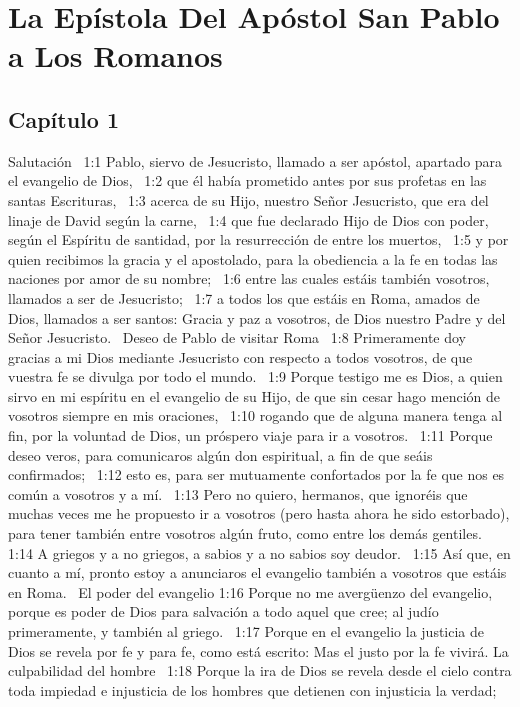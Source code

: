 \chapter{La Epístola Del Apóstol San Pablo a Los Romanos}


\section*{Capítulo 1}
Salutación  
1:1 Pablo, siervo de Jesucristo, llamado a ser apóstol, apartado para el evangelio de Dios,  
1:2 que él había prometido antes por sus profetas en las santas Escrituras,  
1:3 acerca de su Hijo, nuestro Señor Jesucristo, que era del linaje de David según la carne,  
1:4 que fue declarado Hijo de Dios con poder, según el Espíritu de santidad, por la resurrección de entre los muertos,  
1:5 y por quien recibimos la gracia y el apostolado, para la obediencia a la fe en todas las naciones por amor de su nombre;  
1:6 entre las cuales estáis también vosotros, llamados a ser de Jesucristo;  
1:7 a todos los que estáis en Roma, amados de Dios, llamados a ser santos: Gracia y paz a vosotros, de Dios nuestro Padre y del Señor Jesucristo.  
Deseo de Pablo de visitar Roma  
1:8 Primeramente doy gracias a mi Dios mediante Jesucristo con respecto a todos vosotros, de que vuestra fe se divulga por todo el mundo.  
1:9 Porque testigo me es Dios, a quien sirvo en mi espíritu en el evangelio de su Hijo, de que sin cesar hago mención de vosotros siempre en mis oraciones,  
1:10 rogando que de alguna manera tenga al fin, por la voluntad de Dios, un próspero viaje para ir a vosotros.  
1:11 Porque deseo veros, para comunicaros algún don espiritual, a fin de que seáis confirmados;  
1:12 esto es, para ser mutuamente confortados por la fe que nos es común a vosotros y a mí.  
1:13 Pero no quiero, hermanos, que ignoréis que muchas veces me he propuesto ir a vosotros (pero hasta ahora he sido estorbado), para tener también entre vosotros algún fruto, como entre los demás gentiles.  
1:14 A griegos y a no griegos, a sabios y a no sabios soy deudor.  
1:15 Así que, en cuanto a mí, pronto estoy a anunciaros el evangelio también a vosotros que estáis en Roma.  
El poder del evangelio 
1:16 Porque no me avergüenzo del evangelio, porque es poder de Dios para salvación a todo aquel que cree; al judío primeramente, y también al griego.  
1:17 Porque en el evangelio la justicia de Dios se revela por fe y para fe, como está escrito: Mas el justo por la fe vivirá. 
La culpabilidad del hombre  
1:18 Porque la ira de Dios se revela desde el cielo contra toda impiedad e injusticia de los hombres que detienen con injusticia la verdad;  
